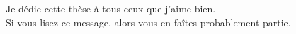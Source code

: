 \begin{ThesisDedication}

	Je dédie cette thèse à tous ceux que j'aime bien. \\
	Si vous lisez ce message, alors vous en faîtes probablement partie.

\end{ThesisDedication}